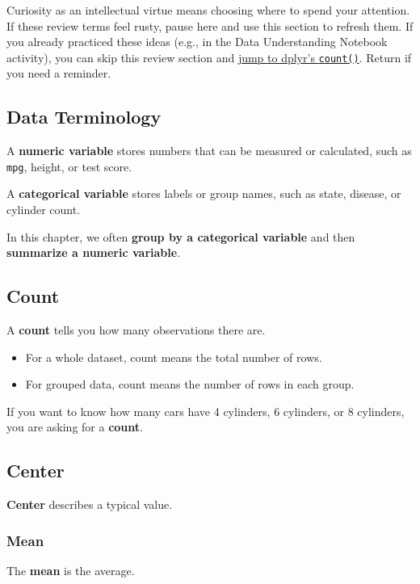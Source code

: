 \documentclass[
]{article}
\begin{document}
Curiosity as an intellectual virtue means choosing where to spend your
attention. If these review terms feel rusty, pause here and use this
section to refresh them. If you already practiced these ideas (e.g., in
the Data Understanding Notebook activity), you can skip this review
section and \hyperref[dplyr-count]{jump to dplyr's \texttt{count()}}.
Return if you need a reminder.

\subsection{Data Terminology}\label{data-terminology}

A \textbf{numeric variable} stores numbers that can be measured or
calculated, such as \texttt{mpg}, height, or test score.

A \textbf{categorical variable} stores labels or group names, such as
state, disease, or cylinder count.

In this chapter, we often \textbf{group by a categorical variable} and
then \textbf{summarize a numeric variable}.

\subsection{Count}\label{count}

A \textbf{count} tells you how many observations there are.

\begin{itemize}
\item
  For a whole dataset, count means the total number of rows.
\item
  For grouped data, count means the number of rows in each group.
\end{itemize}

If you want to know how many cars have 4 cylinders, 6 cylinders, or 8
cylinders, you are asking for a \textbf{count}.

\subsection{Center}\label{center}

\textbf{Center} describes a typical value.

\subsubsection{Mean}\label{mean}

The \textbf{mean} is the average.
\end{document}
